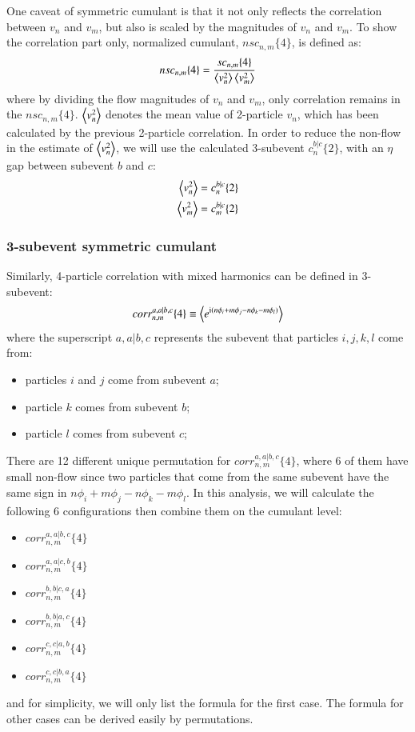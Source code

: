One caveat of symmetric cumulant is that it not only reflects the correlation between $v_n$ and $v_m$, but also is scaled by the magnitudes of $v_n$ and $v_m$. To show the correlation part only, normalized cumulant, $nsc_{n,m}\{4\}$, is defined as:
\begin{equation}
nsc_{n,m}\{4\} = \frac{sc_{n,m}\{4\}}{\left\langle v_n^2\right\rangle\left\langle v_m^2\right\rangle}
\end{equation}
where by dividing the flow magnitudes of $v_{n}$ and $v_{m}$, only correlation remains in the $nsc_{n,m}\{4\}$. $\left\langle v_n^2\right\rangle$ denotes the mean value of 2-particle $v_n$, which has been calculated by the previous 2-particle correlation. In order to reduce the non-flow in the estimate of $\left\langle v_n^2\right\rangle$, we will use the calculated 3-subevent $c_n^{b|c}\{2\}$, with an $\eta$ gap between subevent $b$ and $c$:
\begin{equation}
\begin{split}
\left\langle v_n^2\right\rangle &= c_n^{b|c}\{2\} \\
\left\langle v_m^2\right\rangle &= c_m^{b|c}\{2\}
\end{split}
\end{equation}

\subsubsection{3-subevent symmetric cumulant}
Similarly, 4-particle correlation with mixed harmonics can be defined in 3-subevent:
\begin{equation}
corr_{n,m}^{a,a|b,c}\{4\}\equiv\left\langle e^{\text{i}(n\phi_i+m\phi_j-n\phi_k-m\phi_l)}\right\rangle
\end{equation}
where the superscript $a,a|b,c$ represents the subevent that particles $i,j,k,l$ come from:
\begin{itemize}
\item particles $i$ and $j$ come from subevent $a$;
\item particle $k$ comes from subevent $b$;
\item particle $l$ comes from subevent $c$;
\end{itemize}

There are 12 different unique permutation for $corr_{n,m}^{a,a|b,c}\{4\}$, where 6 of them have small non-flow since two particles that come from the same subevent have the same sign in $n\phi_i+m\phi_j-n\phi_k-m\phi_l$. In this analysis, we will calculate the following 6 configurations then combine them on the cumulant level:
\begin{itemize}
\item $corr_{n,m}^{a,a|b,c}\{4\}$
\item $corr_{n,m}^{a,a|c,b}\{4\}$
\item $corr_{n,m}^{b,b|c,a}\{4\}$
\item $corr_{n,m}^{b,b|a,c}\{4\}$
\item $corr_{n,m}^{c,c|a,b}\{4\}$
\item $corr_{n,m}^{c,c|b,a}\{4\}$
\end{itemize}
and for simplicity, we will only list the formula for the first case. The formula for other cases can be derived easily by permutations.

